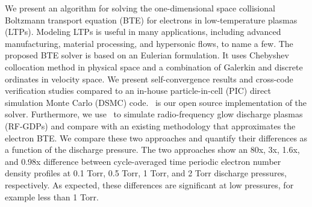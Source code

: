 We present an algorithm for solving the one-dimensional space collisional Boltzmann transport equation (BTE) for electrons in low-temperature plasmas (LTPs). Modeling LTPs is useful in many applications, including advanced manufacturing, material processing, and hypersonic flows, to name a few. The proposed BTE solver is based on an Eulerian formulation. It uses Chebyshev collocation method in physical space and a combination of Galerkin and discrete ordinates in velocity space. We present self-convergence results and cross-code verification studies compared to an in-house particle-in-cell (PIC) direct simulation Monte Carlo (DSMC) code. \bte~is our open source implementation of the solver. Furthermore, we use \bte~to simulate radio-frequency glow discharge plasmas (RF-GDPs) and compare with an existing methodology that approximates the electron BTE. We compare these two approaches and quantify their differences as a function of the discharge pressure. The two approaches show an 80x, 3x, 1.6x, and 0.98x difference between cycle-averaged time periodic electron number density profiles at 0.1 Torr, 0.5 Torr, 1 Torr, and 2 Torr discharge pressures, respectively. As expected, these differences are significant at low pressures, for example less than 1 Torr. 


